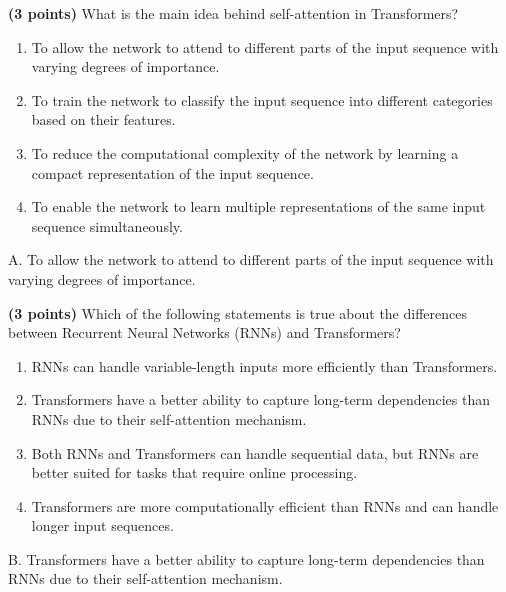 \documentclass{article}
\begin{document}
\begin{probset}
\begin{prob}
\begin{subprobset}
    \newpage

    \begin{subprob}
        \textbf{(3 points)} What is the main idea behind self-attention in Transformers?
        \begin{enumerate}[label=\Alph*.]
            \item To allow the network to attend to different parts of the input sequence with varying degrees of importance.
            \item To train the network to classify the input sequence into different categories based on their features.
            \item To reduce the computational complexity of the network by learning a compact representation of the input sequence.
            \item To enable the network to learn multiple representations of the same input sequence simultaneously.
        \end{enumerate}

        \begin{soln}
            A. To allow the network to attend to different parts of the input sequence with varying degrees of importance.
        \end{soln}
    \end{subprob}

    \begin{subprob}
        \textbf{(3 points)} Which of the following statements is true about the differences between Recurrent Neural Networks (RNNs) and Transformers?

        \begin{enumerate}[label=\Alph*.]
            \item RNNs can handle variable-length inputs more efficiently than Transformers.
            \item Transformers have a better ability to capture long-term dependencies than RNNs due to their self-attention mechanism.
            \item Both RNNs and Transformers can handle sequential data, but RNNs are better suited for tasks that require online processing.
            \item Transformers are more computationally efficient than RNNs and can handle longer input sequences.
        \end{enumerate}

        \begin{soln}
            B. Transformers have a better ability to capture long-term dependencies than RNNs due to their self-attention mechanism.
        \end{soln}
    \end{subprob}
    \end{subprobset}
\end{prob}


\end{probset}
\end{document}
